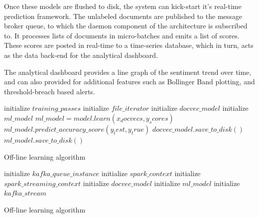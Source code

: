 \documentclass[conference]{IEEEtran}
\begin{document}
        Once these models are flushed to disk, the system can kick-start it's real-time prediction framework. 
        The unlabeled documents are published to the message broker queue, to which the daemon component of the architecture is subscribed to. 
        It processes lists of documents in micro-batches and emits a list of scores. 
        These scores are posted in real-time to a time-series database, which in turn, acts as the data back-end for the analytical dashboard.

        The analytical dashboard provides a line graph of the sentiment trend over time, and can also provided for additional features such as Bollinger Band plotting, and threshold-breach based alerts.

\vspace{5mm}

\begin{algorithm}[ht] \label{offline_module_algo}
    \DontPrintSemicolon 
    \;
    initialize $training\_passes$\;
    initialize $file\_iterator$\;
    initialize $docvec\_model$\;
    initialize $ml\_model$\;
    \;
    \;
    \;
    \;
    $ml\_model = model.learn(x_docvecs, y_scores)$\;
    $ml\_model.predict\_accuracy\_score(y_test, y_true)$\;
    \;
    $docvec\_model.save\_to\_disk()$\;
    $ml\_model.save\_to\_disk()$\;
    \;
    \caption{Off-line learning algorithm}
\end{algorithm}

\begin{algorithm}[ht] \label{online_module}
    \DontPrintSemicolon 
    \;
    initialize $kafka\_queue\_instance$\;
    initialize $spark\_context$\;
    initialize $spark\_streaming\_context$\;
    \;
    initialize $docvec\_model$\;
    initialize $ml\_model$\;
    initialize $kafka\_stream$\;
    \;
    \;
    \caption{Off-line learning algorithm}
\end{algorithm}
\end{document}
